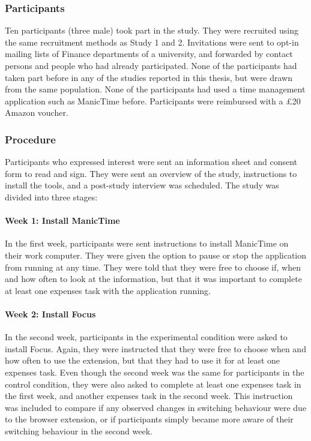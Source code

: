 \subsubsection{Participants}
Ten participants (three male) took part in the study. They were recruited using the same recruitment methods as Study 1 and 2. Invitations were sent to opt-in mailing lists of Finance departments of a university, and forwarded by contact persons and people who had already participated. None of the participants had taken part before in any of the studies reported in this thesis, but were drawn from the same population. None of the participants had used a time management application such as ManicTime before. Participants were reimbursed with a \pounds 20 Amazon voucher.

\subsubsection{Procedure}
Participants who expressed interest were sent an information sheet and consent form to read and sign. They were sent an overview of the study, instructions to install the tools, and a post-study interview was scheduled.
The study was divided into three stages:
\paragraph{Week 1: Install ManicTime}
In the first week, participants were sent instructions to install ManicTime on their work computer. They were given the option to pause or stop the application from running at any time. They were told that they were free to choose if, when and how often to look at the information, but that it was important to complete at least one expenses task with the application running. 

\paragraph{Week 2: Install Focus}
In the second week, participants in the experimental condition were asked to install Focus. Again, they were instructed that they were free to choose when and how often to use the extension, but that they had to use it for at least one expenses task. Even though the second week was the same for participants in the control condition, they were also asked to complete at least one expenses task in the first week, and another expenses task in the second week. This instruction was included to compare if any observed changes in switching behaviour were due to the browser extension, or if participants simply became more aware of their switching behaviour in the second week.

